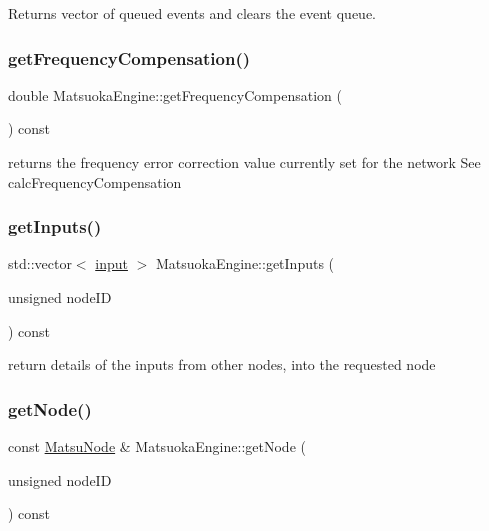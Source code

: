 Returns vector of queued events and clears the event queue. 

\mbox{\label{classMatsuokaEngine_a87b0d0b8fe0447fba1fe7456dbea4e11}} 
\subsubsection{\texorpdfstring{get\+Frequency\+Compensation()}{getFrequencyCompensation()}}
{\footnotesize\ttfamily double Matsuoka\+Engine\+::get\+Frequency\+Compensation (\begin{DoxyParamCaption}{ }\end{DoxyParamCaption}) const}

returns the frequency error correction value currently set for the network See calc\+Frequency\+Compensation \mbox{\label{classMatsuokaEngine_a7b8067a4f72a8376635ce2d61bece1f2}} 
\subsubsection{\texorpdfstring{get\+Inputs()}{getInputs()}}
{\footnotesize\ttfamily std\+::vector$<$ \mbox{\hyperlink{classMatsuokaEngine_a811a5449f07004a2eb6b34e8c9bd862f}{input}} $>$ Matsuoka\+Engine\+::get\+Inputs (\begin{DoxyParamCaption}\item[{unsigned}]{node\+ID }\end{DoxyParamCaption}) const}



return details of the inputs from other nodes, into the requested node 

\mbox{\label{classMatsuokaEngine_ae2d2de39e55b20e6c579039eb6081246}} 
\subsubsection{\texorpdfstring{get\+Node()}{getNode()}}
{\footnotesize\ttfamily const \mbox{\hyperlink{classMatsuNode}{Matsu\+Node}} \& Matsuoka\+Engine\+::get\+Node (\begin{DoxyParamCaption}\item[{unsigned}]{node\+ID }\end{DoxyParamCaption}) const}




